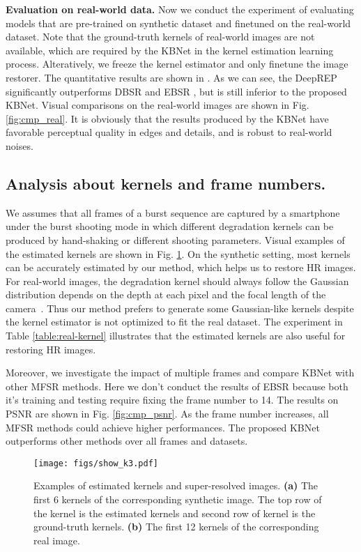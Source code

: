 \noindent \textbf{Evaluation on real-world data.}
Now we conduct the experiment of evaluating models that are pre-trained on synthetic dataset and finetuned on the real-world dataset. Note that the ground-truth kernels of real-world images are not available, which are required by the KBNet in the kernel estimation learning process. Alteratively, we freeze the kernel estimator and only finetune the image restorer. The quantitative results are shown in . As we can see, the DeepREP \cite{bhat2021deepre} significantly outperforms DBSR \cite{bhat2021deep} and EBSR \cite{luo2021ebsr}, but is still inferior to the proposed KBNet. Visual comparisons on the real-world images are shown in Fig. \ref{fig:cmp_real}. It is obviously that the results produced by the KBNet have favorable perceptual quality in edges and details, and is robust to real-world noises. 



\subsection{Analysis about kernels and frame numbers.}

We assumes that all frames of a burst sequence are captured by a smartphone under the burst shooting mode in which different degradation kernels can be produced by hand-shaking or different shooting parameters. Visual examples of the estimated kernels are shown in Fig. \ref{fig:show_k}.
On the synthetic setting, most kernels can be accurately estimated by our method, which helps us to restore HR images. For real-world images, the degradation kernel should always follow the Gaussian distribution depends on the depth at each pixel and the focal length of the camera~\cite{chaudhuri1999depth}. Thus our method prefers to generate some Gaussian-like kernels despite the kernel estimator is not optimized to fit the real dataset. The experiment in Table \ref{table:real-kernel} illustrates that the estimated kernels are also useful for restoring HR images.

Moreover, we investigate the impact of multiple frames and compare KBNet with other MFSR methods. Here we don't conduct the results of EBSR because both it's training and testing require fixing the frame number to 14. The results on PSNR are shown in Fig. \ref{fig:cmp_psnr}. As the frame number increases, all MFSR methods could achieve higher performances. The proposed KBNet outperforms other methods over all frames and datasets.


\begin{figure}[t]
\setlength{\abovecaptionskip}{0.05in}
\centering
  \texttt{[image: figs/show\_k3.pdf]}
  \caption{Examples of estimated kernels and super-resolved images. \textbf{(a)} The first 6 kernels of the corresponding synthetic image. The top row of the kernel is the estimated kernels and second row of kernel is the ground-truth kernels. \textbf{(b)} The first 12 kernels of the corresponding real image.}
  \label{fig:show_k}
\end{figure}


